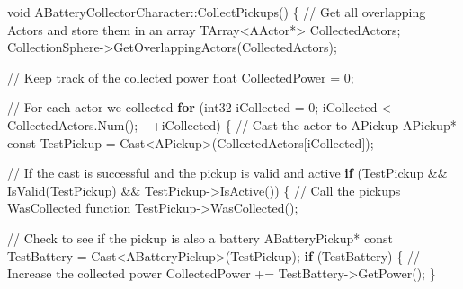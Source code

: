 \documentclass[
  letterpaper,
  DIV=11,
  numbers=noendperiod]{scrartcl}
\newenvironment{Shaded}{\begin{snugshade}}{\end{snugshade}}
\newcommand{\AttributeTok}[1]{\textcolor[rgb]{0.40,0.45,0.13}{#1}}
\newcommand{\CommentTok}[1]{\textcolor[rgb]{0.37,0.37,0.37}{#1}}
\newcommand{\ControlFlowTok}[1]{\textcolor[rgb]{0.00,0.23,0.31}{\textbf{#1}}}
\newcommand{\DataTypeTok}[1]{\textcolor[rgb]{0.68,0.00,0.00}{#1}}
\newcommand{\DecValTok}[1]{\textcolor[rgb]{0.68,0.00,0.00}{#1}}
\newcommand{\NormalTok}[1]{\textcolor[rgb]{0.00,0.23,0.31}{#1}}
\newcommand{\OperatorTok}[1]{\textcolor[rgb]{0.37,0.37,0.37}{#1}}
\begin{document}
\begin{Shaded}
\begin{Highlighting}[]
\DataTypeTok{void}\NormalTok{ ABatteryCollectorCharacter}\OperatorTok{::}\NormalTok{CollectPickups}\OperatorTok{()}
\OperatorTok{\{}
    \CommentTok{// Get all overlapping Actors and store them in an array}
\NormalTok{    TArray}\OperatorTok{\textless{}}\NormalTok{AActor}\OperatorTok{*\textgreater{}}\NormalTok{ CollectedActors}\OperatorTok{;}
\NormalTok{    CollectionSphere}\OperatorTok{{-}\textgreater{}}\NormalTok{GetOverlappingActors}\OperatorTok{(}\NormalTok{CollectedActors}\OperatorTok{);}
    
    \CommentTok{// Keep track of the collected power}
    \DataTypeTok{float}\NormalTok{ CollectedPower }\OperatorTok{=} \DecValTok{0}\OperatorTok{;}
    
    \CommentTok{// For each actor we collected}
    \ControlFlowTok{for} \OperatorTok{(}\NormalTok{int32 iCollected }\OperatorTok{=} \DecValTok{0}\OperatorTok{;}\NormalTok{ iCollected }\OperatorTok{\textless{}}\NormalTok{ CollectedActors}\OperatorTok{.}\NormalTok{Num}\OperatorTok{();} \OperatorTok{++}\NormalTok{iCollected}\OperatorTok{)}
    \OperatorTok{\{}
        \CommentTok{// Cast the actor to APickup}
\NormalTok{        APickup}\OperatorTok{*} \AttributeTok{const}\NormalTok{ TestPickup }\OperatorTok{=}\NormalTok{ Cast}\OperatorTok{\textless{}}\NormalTok{APickup}\OperatorTok{\textgreater{}(}\NormalTok{CollectedActors}\OperatorTok{[}\NormalTok{iCollected}\OperatorTok{]);}
        
        \CommentTok{// If the cast is successful and the pickup is valid and active}
        \ControlFlowTok{if} \OperatorTok{(}\NormalTok{TestPickup }\OperatorTok{\&\&}\NormalTok{ IsValid}\OperatorTok{(}\NormalTok{TestPickup}\OperatorTok{)} \OperatorTok{\&\&}\NormalTok{ TestPickup}\OperatorTok{{-}\textgreater{}}\NormalTok{IsActive}\OperatorTok{())}
        \OperatorTok{\{}
            \CommentTok{// Call the pickup\textquotesingle{}s WasCollected function}
\NormalTok{            TestPickup}\OperatorTok{{-}\textgreater{}}\NormalTok{WasCollected}\OperatorTok{();}
            
            \CommentTok{// Check to see if the pickup is also a battery}
\NormalTok{            ABatteryPickup}\OperatorTok{*} \AttributeTok{const}\NormalTok{ TestBattery }\OperatorTok{=}\NormalTok{ Cast}\OperatorTok{\textless{}}\NormalTok{ABatteryPickup}\OperatorTok{\textgreater{}(}\NormalTok{TestPickup}\OperatorTok{);}
            \ControlFlowTok{if} \OperatorTok{(}\NormalTok{TestBattery}\OperatorTok{)}
            \OperatorTok{\{}
                \CommentTok{// Increase the collected power}
\NormalTok{                CollectedPower }\OperatorTok{+=}\NormalTok{ TestBattery}\OperatorTok{{-}\textgreater{}}\NormalTok{GetPower}\OperatorTok{();}
            \OperatorTok{\}}
            

\end{Highlighting}
\end{Shaded}
\end{document}
